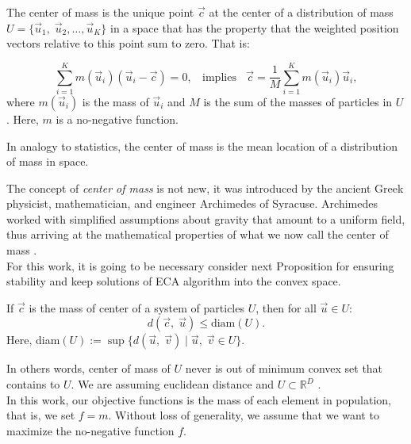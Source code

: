 \documentclass[graybox]{svmult}
\begin{document}
\begin{definition}
	The center of mass is the unique point $\vec{c}$ at the center of a distribution of mass $U = \{\vec{u}_1,\; \vec{u}_2 , \ldots , \vec{u}_K \}$ in a space that has the property that the weighted position vectors relative to this point sum to zero. That is:

	\begin{equation}
		\sum_{i = 1}^K m(\vec{u}_i) (\vec{u}_i - \vec{c}) = 0, \;\; \text{ implies } \;\; 
		\vec{c} = \dfrac{1}{M} \sum_{i = 1}^K  m(\vec{u}_i)  \vec{u}_i,
		\label{eq:masscenter}
	\end{equation}
	where $m(\vec{u}_i)$ is the mass of $\vec{u}_i$ and  $M$ is the sum of the masses of particles in $U$. Here, $m$ is a no-negative function.
\end{definition}
%
%
\begin{note}
In analogy to statistics, the center of mass is the mean location of a distribution of mass in space.
\end{note}
% 
The concept of \textit{center of mass} is not new, it was introduced by the ancient Greek physicist, mathematician, and engineer Archimedes of Syracuse. Archimedes worked with simplified assumptions about gravity that amount to a uniform field, thus arriving at the mathematical properties of what we now call the center of mass \cite{kleppner73}.\\

For this work, it is going to be necessary consider next Proposition for ensuring stability and keep solutions of ECA algorithm into the convex space.

\begin{proposition}
	If $\vec{c}$ is the mass of center of a system of particles $U$, then  for all $ \vec{u}\in U $:
	$$  d(\vec{c},\; \vec{u} )  \leq \text{diam}(U). $$
	Here, diam$(U) := \sup\{ d(\vec{u},\; \vec{v} ) \; | \; \vec{u} ,\; \vec{v} \in U \}$.
\end{proposition}
%
\noindent
In others words, center of mass of $U$ never is out of minimum	convex set that contains to $U$. We are assuming euclidean distance and $U \subset \mathbb{R}^D$ \cite{rudin}.\\

%
% 
%

In this work, our objective functions is the mass of each element in population, that is, we set $f = m$. Without loss of generality, we assume that we want to maximize the no-negative function $f$.
\end{document}
